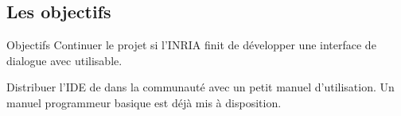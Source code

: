 \subsection{Les objectifs}

    \begin{frame}{Objectifs}
        Continuer le projet si l'INRIA finit de développer une interface de dialogue avec \coq{} utilisable.

        Distribuer l'IDE de \coquille{} dans la communauté \coq{} avec un petit manuel d'utilisation.
        Un manuel programmeur basique est déjà mis à disposition.
    \end{frame}
